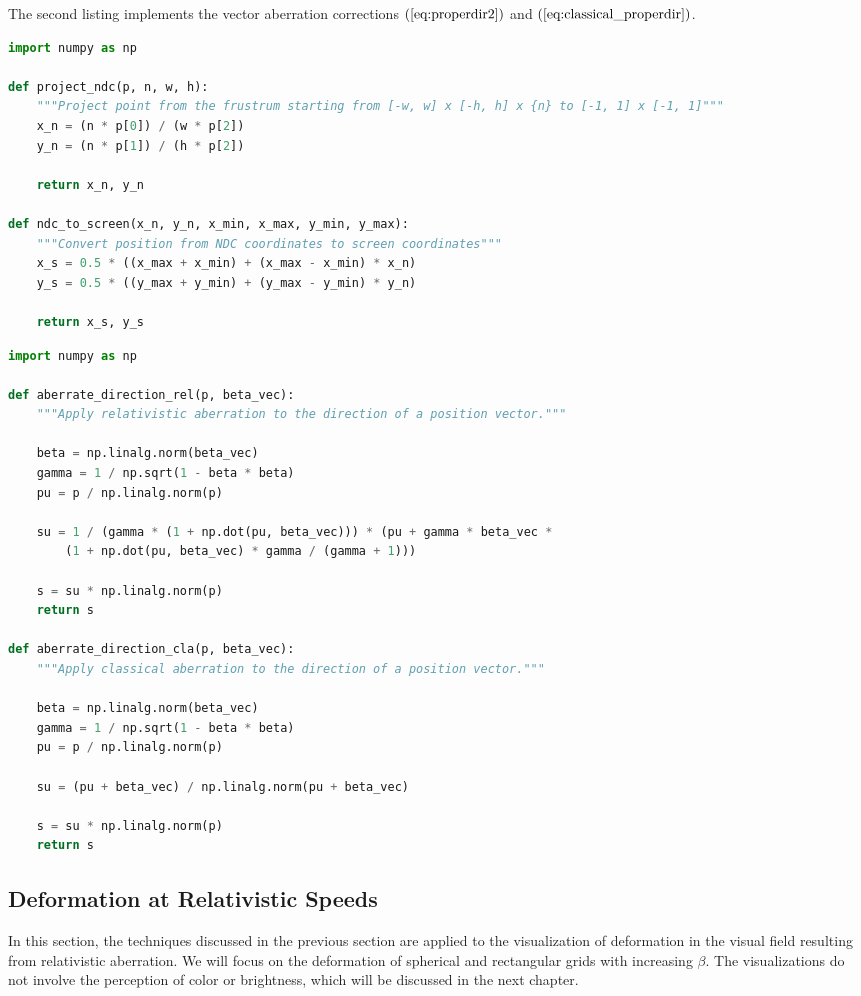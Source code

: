 \documentclass [12pt, a4paper] {article}
\begin{document}
The second listing implements the vector aberration corrections 
$(\ref{eq:properdir2})$ and $(\ref{eq:classical_properdir})$.

\begin{lstlisting}[language=python, caption={Projection on world coordinates into screen or image coordinates.}]
import numpy as np

def project_ndc(p, n, w, h):
    """Project point from the frustrum starting from [-w, w] x [-h, h] x {n} to [-1, 1] x [-1, 1]"""
    x_n = (n * p[0]) / (w * p[2])
    y_n = (n * p[1]) / (h * p[2])

    return x_n, y_n

def ndc_to_screen(x_n, y_n, x_min, x_max, y_min, y_max):
    """Convert position from NDC coordinates to screen coordinates"""
    x_s = 0.5 * ((x_max + x_min) + (x_max - x_min) * x_n)
    y_s = 0.5 * ((y_max + y_min) + (y_max - y_min) * y_n)

    return x_s, y_s
\end{lstlisting}

\begin{lstlisting}[language=python, caption={Relativistic and classical aberration corrections.}]
import numpy as np

def aberrate_direction_rel(p, beta_vec):
    """Apply relativistic aberration to the direction of a position vector."""

    beta = np.linalg.norm(beta_vec)
    gamma = 1 / np.sqrt(1 - beta * beta)
    pu = p / np.linalg.norm(p)
    
    su = 1 / (gamma * (1 + np.dot(pu, beta_vec))) * (pu + gamma * beta_vec * 
        (1 + np.dot(pu, beta_vec) * gamma / (gamma + 1)))
    
    s = su * np.linalg.norm(p)
    return s

def aberrate_direction_cla(p, beta_vec):
    """Apply classical aberration to the direction of a position vector."""

    beta = np.linalg.norm(beta_vec)
    gamma = 1 / np.sqrt(1 - beta * beta)
    pu = p / np.linalg.norm(p)
    
    su = (pu + beta_vec) / np.linalg.norm(pu + beta_vec)
    
    s = su * np.linalg.norm(p)
    return s
\end{lstlisting}
\subsection{Deformation at Relativistic Speeds}
In this section, the techniques discussed in the previous section are applied to the 
visualization of deformation in the visual field resulting from relativistic 
aberration. We will focus on the deformation of spherical and rectangular grids with 
increasing $\beta$. The visualizations do not involve the perception of color or 
brightness, which will be discussed in the next chapter.
\end{document}
